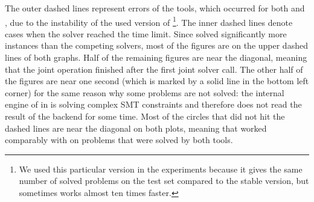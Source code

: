 The outer dashed lines represent errors of the tools, which occurred for both \racer{} and \theringenCICI{}, due to the instability of the used version of \racer{}\footnote{We used this particular version in the experiments because it gives the same number of solved problems on the test set compared to the stable version, but sometimes works almost ten times faster.}. The inner dashed lines denote cases when the solver reached the time limit. Since \theringenCICI{} solved significantly more instances than the competing solvers, most of the figures are on the upper dashed lines of both graphs. Half of the remaining figures are near the diagonal, meaning that the joint operation finished after the first joint solver call. The other half of the figures are near one second (which is marked by a solid line in the bottom left corner) for the same reason why some problems are not solved: the internal engine of \racer{} in \theringenCICI{} is solving complex SMT constraints and therefore does not read the result of the backend for some time. Most of the circles that did not hit the dashed lines are near the diagonal on both plots, meaning that \theringenCICI{} worked comparably with \racer{} on problems that were solved by both tools.

